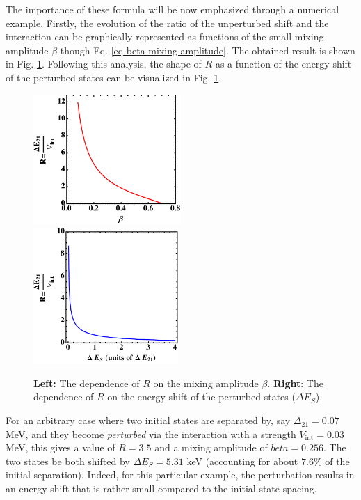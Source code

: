 The importance of these formula will be now emphasized through a numerical example. Firstly, the evolution of the ratio of the unperturbed shift and the interaction can be graphically represented as functions of the small mixing amplitude $\beta$ though Eq. \ref{eq-beta-mixing-amplitude}. The obtained result is shown in Fig. \ref{fig-beta-mixing-amplitude}. Following this analysis, the shape of $R$ as a function of the energy shift of the perturbed states can be visualized in Fig. \ref{fig-beta-mixing-amplitude}.
\begin{figure}
    \centering
    \includegraphics[width=0.5\textwidth]{Chapters/Figures/beta_mixing_amplitude.pdf}
    \includegraphics[width=0.49\textwidth]{Chapters/Figures/energy_shift_mixing_shape.pdf}
    \caption{\textbf{Left:} The dependence of $R$ on the mixing amplitude $\beta$. \textbf{Right}: The dependence of $R$ on the energy shift of the perturbed states ($\Delta E_S$).}
    \label{fig-beta-mixing-amplitude}
\end{figure}

For an arbitrary case where two initial states are separated by, say $\Delta_{21}=0.07$ MeV, and they become \emph{perturbed} via the interaction with a strength $V_\text{int}=0.03$ MeV, this gives a value of $R=3.5$ and a mixing amplitude of $beta=0.256$. The two states be both shifted by $\Delta E_S=5.31$ keV (accounting for about $7.6 \%$ of the initial separation). Indeed, for this particular example, the perturbation results in an energy shift that is rather small compared to the initial state spacing.

